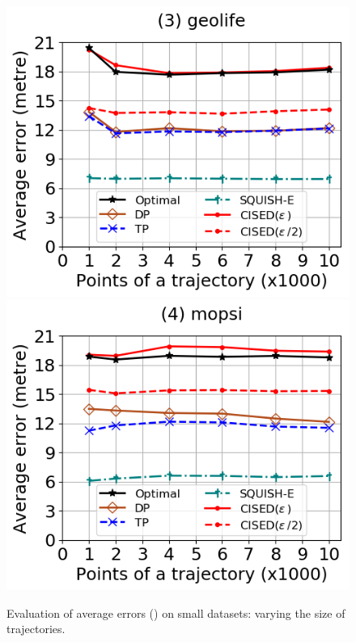 \begin{figure}[tb!]
	\includegraphics[scale=0.315]{Figures/Exp-SED-error-size-geolife.png}	\hspace{1ex}
	\includegraphics[scale=0.315]{Figures/Exp-SED-error-size-mopsi.png}		
	\vspace{-3ex}
	\caption{\small Evaluation of average errors (\sed) on small datasets: varying the size of
    trajectories.}
  \label{fig:ae-sed-size}
	\vspace{-2ex}
\end{figure}



